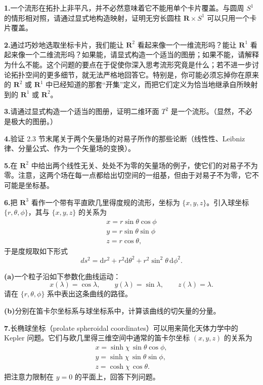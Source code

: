 \textbf{1.}\quad 一个流形在拓扑上非平凡，并不必然意味着它不能用单个卡片覆盖。与圆周 $S^{1}$ 的情形相对照，请通过显式地构造映射，证明无穷长圆柱 $\mathbf{R}\times S^{1}$ 可以只用一个卡片覆盖。

\textbf{2.}\quad 通过巧妙地选取坐标卡片，我们能让 $\mathbf{R}^{2}$ 看起来像一个一维流形吗？能让 $\mathbf{R}^{1}$ 看起来像一个二维流形吗？如果能，请显式构造一个适当的图册；如果不能，请解释为什么不能。这个问题的要点在于促使你深入思考流形究竟是什么；若不进一步讨论拓扑空间的更多细节，就无法严格地回答它。特别是，你可能必须忘掉你在原来的 $\mathbf{R}^{2}$ 或 $\mathbf{R}^{1}$ 中已经知道的那套“开集”定义，而把它们定义为恰当地继承自所映射到的 $\mathbf{R}^{1}$ 或 $\mathbf{R}^{2}$。

\textbf{3.}\quad 请通过显式构造一个适当的图册，证明二维环面 $T^{2}$ 是一个流形。（显然，不必是极大的图册。）

\textbf{4.}\quad 验证 2.3 节末尾关于两个矢量场的对易子所作的那些论断（线性性、Leibniz 律、分量公式、作为一个矢量场的变换）。

\textbf{5.}\quad 在 $\mathbf{R}^{2}$ 中给出两个线性无关、处处不为零的矢量场的例子，使它们的对易子不为零。注意，这两个场在每一点都给出切空间的一组基，但由于对易子不为零，它不可能是坐标基。

\textbf{6.}\quad 把 $\mathbf{R}^{3}$ 看作一个带有平直欧几里得度规的流形，坐标为 $\{x,y,z\}$。引入球坐标 $\{r,\theta,\phi\}$，其与 $\{x,y,z\}$ 的关系为
\begin{gather*}
x=r\sin\theta\cos\phi\\
y=r\sin\theta\sin\phi\\
z=r\cos\theta, \tag{2.99}
\end{gather*}
于是度规取如下形式
\begin{equation*}
ds^{2}=\mathrm{d}r^{2}+r^{2}\mathrm{d}\theta^{2}+r^{2}\sin^{2}\theta\,\mathrm{d}\phi^{2}. \tag{2.100}
\end{equation*}

\textbf{(a)}\quad 一个粒子沿如下参数化曲线运动：
\begin{equation*}
x(\lambda)=\cos\lambda,\qquad y(\lambda)=\sin\lambda,\qquad z(\lambda)=\lambda. \tag{2.101}
\end{equation*}
请在 $\{r,\theta,\phi\}$ 系中表出这条曲线的路径。

\textbf{(b)}\quad 分别在笛卡尔坐标系与球坐标系中，计算该曲线的切矢量的分量。

\textbf{7.}\quad 长椭球坐标（prolate spheroidal coordinates）可以用来简化天体力学中的 Kepler 问题。它们与欧几里得三维空间中通常的笛卡尔坐标 $(x,y,z)$ 的关系为
\begin{gather*}
x=\sinh\chi\,\sin\theta\cos\phi,\\
y=\sinh\chi\,\sin\theta\sin\phi,\\
z=\cosh\chi\,\cos\theta.
\end{gather*}
把注意力限制在 $y=0$ 的平面上，回答下列问题。

